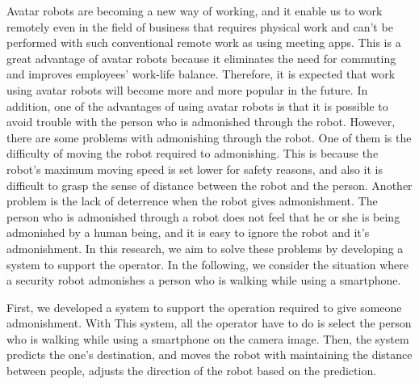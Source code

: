 \documentclass{kuisthesis}
\begin{document}
\begin{eabstract}
Avatar robots are becoming a new way of working, and it enable us to work remotely even in the field of business that requires physical work and can't be performed with such conventional remote work as using meeting apps.
This is a great advantage of avatar robots because it eliminates the need for commuting and improves employees' work-life balance.
Therefore, it is expected that work using avatar robots will become more and more popular in the future.
In addition, one of the advantages of using avatar robots is that it is possible to avoid trouble with the person who is admonished through the robot.
However, there are some problems with admonishing through the robot.
One of them is the difficulty of moving the robot required to admonishing.
This is because the robot's maximum moving speed is set lower for safety reasons, and also it is difficult to grasp the sense of distance between the robot and the person.
Another problem is the lack of deterrence when the robot gives admonishment.
The person who is admonished through a robot does not feel that he or she is being admonished by a human being, and it is easy to ignore the robot and it's admonishment.
In this research, we aim to solve these problems by developing a system to support the operator.
In the following, we consider the situation where a security robot admonishes a person who is walking while using a smartphone.

First, we developed a system to support the operation required to give someone admonishment.
With This system, all the operator have to do is select the person who is walking while using a smartphone on the camera image. 
Then, the system predicts the one's destination, and moves the robot with maintaining the distance between people, adjusts the direction of the robot based on the prediction.


\end{eabstract}
\end{document}
